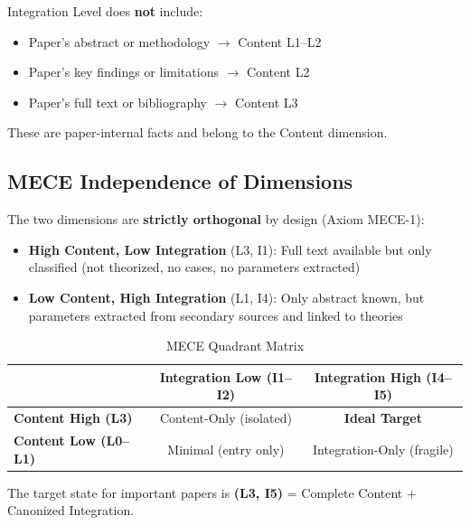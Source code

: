 \begin{tcolorbox}[colback=yellow!5!white, colframe=yellow!75!black,
    title=Note: What Integration Level Does NOT Include]
Integration Level does \textbf{not} include:
\begin{itemize}[nosep]
    \item Paper's abstract or methodology $\rightarrow$ Content L1--L2
    \item Paper's key findings or limitations $\rightarrow$ Content L2
    \item Paper's full text or bibliography $\rightarrow$ Content L3
\end{itemize}
These are paper-internal facts and belong to the Content dimension.
\end{tcolorbox}

\subsection{MECE Independence of Dimensions}

The two dimensions are \textbf{strictly orthogonal} by design (Axiom MECE-1):

\begin{itemize}
    \item \textbf{High Content, Low Integration} (L3, I1): Full text available but only classified (not theorized, no cases, no parameters extracted)
    \item \textbf{Low Content, High Integration} (L1, I4): Only abstract known, but parameters extracted from secondary sources and linked to theories
\end{itemize}

\begin{table}[htbp]
\centering
\caption{MECE Quadrant Matrix}
\label{tab:mece-quadrants}
\renewcommand{\arraystretch}{1.3}
\begin{tabular}{@{}l|cc@{}}
\toprule
 & \textbf{Integration Low (I1--I2)} & \textbf{Integration High (I4--I5)} \\
\midrule
\textbf{Content High (L3)} & Content-Only (isolated) & \textbf{Ideal Target} \\
\textbf{Content Low (L0--L1)} & Minimal (entry only) & Integration-Only (fragile) \\
\bottomrule
\end{tabular}
\end{table}

The target state for important papers is \textbf{(L3, I5)} = Complete Content + Canonized Integration.

